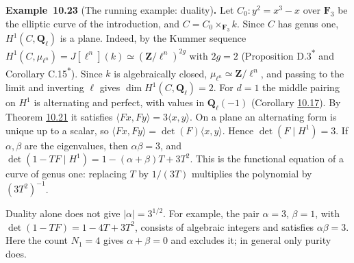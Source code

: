\documentclass[11pt]{article}
\newenvironment{bpstatement}[2]{\par\addvspace{0.6\baselineskip}\noindent\textbf{#1}#2\textbf{.}\enspace\ignorespaces}
  {\par\addvspace{0.4\baselineskip}}
\newcommand{\bpout}[1]{#1\textsuperscript{\hyperlink{bp-outside}{\ensuremath{\ast}}}}
\begin{document}
\label{bp69}%
\begin{bpstatement}{Example~10.23}{ (The running example: duality)}
Let \(C_0\colon y^2=x^3-x\) over \(\mathbf F_3\) be the elliptic curve of the introduction, and \(C=C_0\times_{\mathbf F_3}k\). Since \(C\) has genus one, \(H^1(C,\mathbf Q_\ell)\) is a plane. Indeed, by the Kummer sequence \(H^1(C,\mu_{\ell^n})=J[\ell^n](k)\simeq(\mathbf Z/\ell^n)^{2g}\) with \(2g=2\) (Proposition \bpout{D.3} and Corollary \bpout{C.15}). Since \(k\) is algebraically closed, \(\mu_{\ell^n}\simeq\mathbf Z/\ell^n\), and passing to the limit and inverting \(\ell\) gives \(\dim H^1(C,\mathbf Q_\ell)=2\). For \(d=1\) the middle pairing on \(H^1\) is alternating and perfect, with values in \(\mathbf Q_\ell(-1)\) (Corollary \hyperref[bp52]{10.17}). By Theorem \hyperref[bp65]{10.21} it satisfies \(\langle Fx,Fy\rangle=3\langle x,y\rangle\). On a plane an alternating form is unique up to a scalar, so \(\langle Fx,Fy\rangle=\det(F)\langle
x,y\rangle\). Hence \(\det(F\mid H^1)=3\). If \(\alpha,\beta\) are the eigenvalues, then \(\alpha\beta=3\), and \(\det(1-TF\mid H^1)=1-(\alpha+\beta)T+3T^2\). This is the functional equation of a curve of genus one: replacing \(T\) by \(1/(3T)\) multiplies the polynomial by \((3T^2)^{-1}\).

Duality alone does not give \(|\alpha|=3^{1/2}\). For example, the pair \(\alpha=3\), \(\beta=1\), with \(\det(1-TF)=1-4T+3T^2\), consists of algebraic integers and satisfies \(\alpha\beta=3\). Here the count \(N_1=4\) gives \(\alpha+\beta=0\) and excludes it; in general only purity does.
\end{bpstatement}



\clearpage{}\hypertarget{bp-outside}{}%
\end{document}
